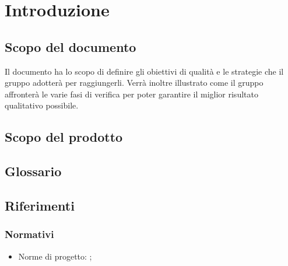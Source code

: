 \documentclass[PianoDiQualifica.tex]{subfiles}
\begin{document}
\section{Introduzione}
	\subsection{Scopo del documento}
		Il documento ha lo scopo di definire gli obiettivi di qualità e le strategie che il gruppo \GRUPPO{}
		adotterà per raggiungerli. Verrà inoltre illustrato come il gruppo affronterà le varie fasi di verifica
		per poter garantire il miglior risultato qualitativo possibile.
	\subsection{Scopo del prodotto}
		\SCOPO
	\subsection{Glossario}
		\GLOSSARIO
	\subsection{Riferimenti}
		\subsubsection{Normativi}
			\begin{itemize}
				\item Norme di progetto: \NPdocRR{};
			\end{itemize}
\end{document}
